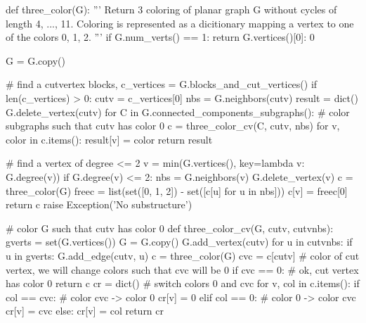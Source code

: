 \begin{sageCell}
    def three_color(G):
    '''
    Return 3 coloring of planar graph G without cycles of length 4, ..., 11.
    Coloring is represented as a dicitionary mapping a vertex to one of the colors 0, 1, 2.
    '''
    if G.num_verts() == 1:
        return {G.vertices()[0]: 0}

    G = G.copy()

    # find a cutvertex
    blocks, c_vertices = G.blocks_and_cut_vertices()
    if len(c_vertices) > 0:
        cutv = c_vertices[0]
        nbs = G.neighbors(cutv)
        result = dict()
        G.delete_vertex(cutv)
        for C in G.connected_components_subgraphs():
            # color subgraphs such that cutv has color 0
            c = three_color_cv(C, cutv, nbs)
            for v, color in c.items():
                result[v] = color
        return result

    # find a vertex of degree <= 2
    v = min(G.vertices(), key=lambda v: G.degree(v))
    if G.degree(v) <= 2:
        nbs = G.neighbors(v)
        G.delete_vertex(v)
        c = three_color(G)
        freec = list(set([0, 1, 2]) - set([c[u] for u in nbs]))
        c[v] = freec[0]
        return c
    raise Exception('No substructure')

# color G such that cutv has color 0
def three_color_cv(G, cutv, cutvnbs):
    gverts = set(G.vertices())
    G = G.copy()
    G.add_vertex(cutv)
    for u in cutvnbs:
        if u in gverts:
            G.add_edge(cutv, u)
    c = three_color(G)
    cvc = c[cutv] # color of cut vertex, we will change colors such that cvc will be 0
    if cvc == 0:  # ok, cut vertex has color 0
        return c
    cr = dict()
    # switch colors 0 and cvc
    for v, col in c.items():
        if col == cvc:  # color cvc -> color 0
            cr[v] = 0
        elif col == 0: # color 0 -> color cvc
            cr[v] = cvc
        else:
            cr[v] = col
    return cr
\end{sageCell}